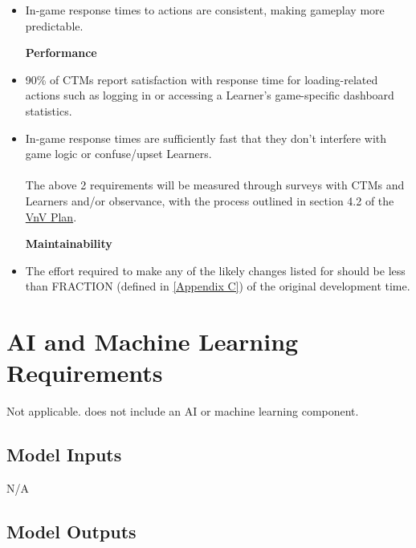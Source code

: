 \documentclass[12pt]{article}
\newcounter{nfrnum} %
\begin{document}
\begin{itemize}
  \textbf{Reliability}
  
  \setcounter{nfrnum}{0}
  \item[\refstepcounter{nfrnum}\thenfrnum \label{NFR-RELY-1}:] In-game response times to actions are consistent, making gameplay more predictable.
  
  \textbf{Performance}

  \setcounter{nfrnum}{0}
  \item[\refstepcounter{nfrnum}\thenfrnum \label{NFR-PERF-1}:] 90\% of CTMs report satisfaction with response time for loading-related actions such as logging in or accessing a Learner's game-specific dashboard statistics.
  \item[\refstepcounter{nfrnum}\thenfrnum \label{NFR-PERF-2}:] In-game response times are sufficiently fast that they don't interfere with game logic or confuse/upset Learners.
  \\\\
  The above 2 requirements will be measured through surveys with CTMs and Learners and/or observance, with the process outlined in section 4.2 of the \href{../../pdfs/VnVPlan/VnVPlan.pdf}{VnV Plan}.
  
  \textbf{Maintainability}
  
  \setcounter{nfrnum}{0}
  \item[\refstepcounter{nfrnum}\thenfrnum \label{NFR-MAINT-1}:]The effort required to make any of the likely changes listed for \progname{} should be less than FRACTION (defined in \ref{Appendix C}) of the original development time.
  
\end{itemize}

\section{AI and Machine Learning Requirements}

Not applicable. \progname{} does not include an AI or machine learning component.

\subsection{Model Inputs}

N/A

\subsection{Model Outputs}
\end{document}
